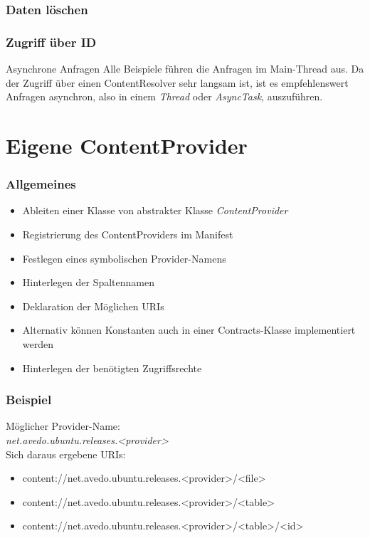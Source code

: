 \begin{frame}
   \frametitle{Daten löschen}
	
\end{frame}

\begin{frame}
   \frametitle{Zugriff über ID}
	
   
   \begin{alertblock}{Asynchrone Anfragen}
	Alle Beispiele führen die Anfragen im Main-Thread aus. Da der Zugriff 
	über einen ContentResolver sehr langsam ist, ist es empfehlenswert 
	Anfragen asynchron, also in einem \emph{Thread} oder \emph{AsyncTask}, auszuführen.
	\end{alertblock}
\end{frame}

\section{Eigene ContentProvider}

\begin{frame}
   \frametitle{Allgemeines}
   \begin{itemize}
   	\item Ableiten einer Klasse von abstrakter Klasse \emph{ContentProvider}
   	\item Registrierung des ContentProviders im Manifest
   	\item Festlegen eines symbolischen Provider-Namens
   	\item Hinterlegen der Spaltennamen
   	\item Deklaration der Möglichen URIs
   	\item Alternativ können Konstanten auch in einer Contracts-Klasse 
   		implementiert werden
   	\item Hinterlegen der benötigten Zugriffsrechte
   \end{itemize}
\end{frame}

\begin{frame}
   \frametitle{Beispiel}
   
   Möglicher Provider-Name:\\
   \emph{net.avedo.ubuntu.releases.\textless{}provider\textgreater}\\
   
   Sich daraus ergebene URIs:
   \begin{itemize}
		\item content://net.avedo.ubuntu.releases.\textless{}provider\textgreater/\textless{}file\textgreater
		\item content://net.avedo.ubuntu.releases.\textless{}provider\textgreater/\textless{}table\textgreater
		\item content://net.avedo.ubuntu.releases.\textless{}provider\textgreater/\textless{}table\textgreater/\textless{}id\textgreater
	\end{itemize}
\end{frame}

